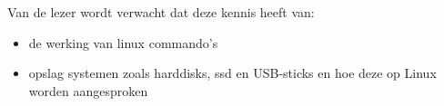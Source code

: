 Van de lezer wordt verwacht dat deze kennis heeft van:
\begin{itemize}
\item de werking van linux commando's
\item opslag systemen zoals harddisks, ssd en USB-sticks en hoe deze op Linux worden aangesproken
\end{itemize}
